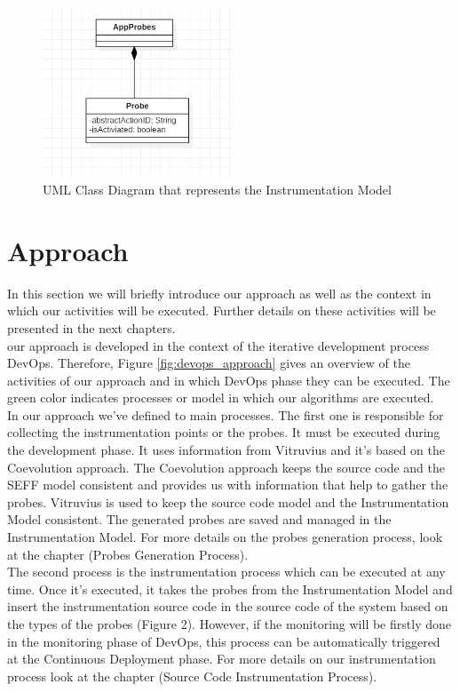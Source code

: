\begin{figure}[h]
\centering
\includegraphics[width=0.5\textwidth]{figures/im}
\caption{UML Class Diagram that represents the Instrumentation Model}
\label{fig:im}
\end{figure}


\section{Approach}
\label{sec:approach}
In this section we will briefly introduce our approach as well as the context in which our activities will be executed. Further details on these activities will be presented in the next chapters.\\

our approach is developed in the context of the iterative development process DevOps. Therefore, Figure \ref{fig:devops_approach} gives an overview of the activities of our approach and in which DevOps phase they can be executed. The green color indicates processes or model in which our algorithms are executed. \\

In our approach we've defined to main processes. The first one is responsible for collecting the instrumentation points or the probes. It must be executed during the development phase. It uses information from Vitruvius and it's based on the Coevolution approach. The Coevolution approach keeps the source code and the SEFF model consistent and provides us with information that help to gather the probes. Vitruvius is used to keep the source code model and the Instrumentation Model consistent. The generated probes are saved and managed in the Instrumentation Model. For more details on the probes generation process, look at the chapter (Probes Generation Process).\\

The second process is the instrumentation process which can be executed at any time. Once it's executed, it takes the probes from the Instrumentation Model and insert the instrumentation source code in the source code of the system based on the types of the probes (Figure 2). However, if the monitoring will be firstly done in the monitoring phase of DevOps, this process can be automatically triggered at the Continuous Deployment phase. For more details on our instrumentation process look at the chapter (Source Code Instrumentation Process).\\

